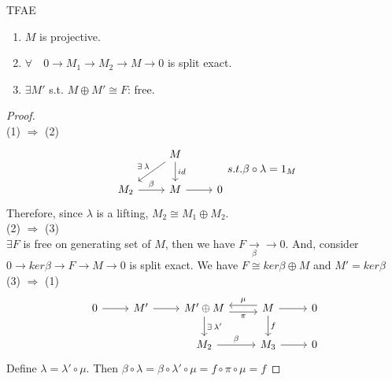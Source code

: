 \begin{prop}
  TFAE
  \begin{enumerate}
    \item $M$ is projective.
    \item $\forall \quad 0 \to M_1 \to M_2 \to M \to 0$ is split exact.
    \item $\exists M'$ s.t. $M \oplus M' \cong F$: free.
  \end{enumerate}
  \begin{proof} $ $\\
    (1) $\Rightarrow$ (2) \\
    $$
      \begin{tikzcd}
                            & M \ar[d, "id"] \ar[dl,"\exists \lambda"swap] \\
        M_2 \ar[r, "\beta"] & M \ar[r]        & 0
      \end{tikzcd}
      s.t. \beta \circ \lambda = 1_M
    $$
    Therefore, since $\lambda$ is a lifting, $M_2 \cong M_1 \oplus M_2$. \\
    (2) $\Rightarrow$ (3) \\
    $\exists  F$ is free on generating set of $M$, then we have $F 
    \underset{\beta}{\to} \to 0 $. And, consider $0 \to ker\beta
    \to F \to M \to 0$ is split exact. We have $F \cong ker\beta
    \oplus M$ and $M' = ker\beta$ \\
    (3) $\Rightarrow$ (1) \\
    $$
    \begin{tikzcd}
      0 \ar[r] & M' \ar[r] & M' \oplus M \ar[r, "\pi" swap, 
      yshift=-0.7ex] \ar[d, "\exists \lambda'"]
      & M \ar[r] \ar[d, "f"] \ar[l, "\mu" swap, yshift=0.7ex] & 0 \\
       & & M_2 \ar[r, "\beta"] & M_3 \ar[r] & 0
    \end{tikzcd}
    $$
    Define $\lambda = \lambda' \circ \mu$. Then $\beta \circ \lambda= 
    \beta \circ \lambda' \circ \mu = f \circ \pi \circ \mu = f$
  \end{proof}
\end{prop}

